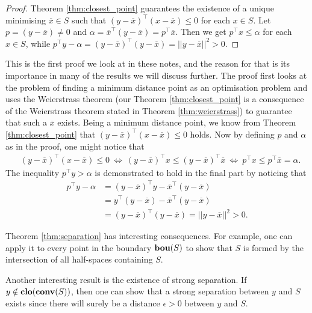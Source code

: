 %
\begin{proof}
	Theorem \ref{thm:closest_point} guarantees the existence of a unique minimising $\overline{x} \in S$ such that $(y-\overline{x})^\top(x - \overline{x}) \leq 0$ for each $x \in S$. Let $p = (y - \overline{x}) \neq 0$ and $\alpha = \overline{x}^\top(y - \overline{x}) = p^\top\overline{x}$. Then we get $p^\top x \leq \alpha$ for each $x \in S$, while $p^\top y - \alpha = (y - \overline{x})^\top(y - \overline{x}) = ||y - \overline{x}||^2 > 0$.
\end{proof}

This is the first proof we look at in these notes, and the reason for that is its importance in many of the results we will discuss further. The proof first looks at the problem of finding a minimum distance point as an optimisation problem and uses the Weierstrass theorem (our Theorem \ref{thm:closest_point} is a consequence of the Weierstrass theorem stated in Theorem \ref{thm:weierstrass}) to guarantee that such a $\overline{x}$ exists. Being a minimum distance point, we know from Theorem \ref{thm:closest_point} that $(y-\overline{x})^\top(x - \overline{x}) \leq 0$ holds. Now by defining $p$ and $\alpha$ as in the proof, one might notice that
%
\begin{align*}
	& (y-\overline{x})^\top(x - \overline{x}) \leq 0 \ \Leftrightarrow \ 
	(y-\overline{x})^\top x \leq (y - \overline{x})^\top\overline{x} \ \Leftrightarrow \ 
	p^\top x \leq p^\top\overline{x} = \alpha. 
\end{align*}
%
The inequality $p^\top y > \alpha$ is demonstrated to hold in the final part by noticing that 
%
\begin{align*}
	p^\top y - \alpha &= 
	(y - \overline{x})^\top y - \overline{x}^\top(y - \overline{x}) \\ &= 
	y^\top(y - \overline{x}) - \overline{x}^\top(y - \overline{x}) \\ & = (y - \overline{x})^\top (y - \overline{x}) = || y - \overline{x} ||^2 > 0.
\end{align*}

Theorem \ref{thm:separation} has interesting consequences. For example, one can apply it to every point in the boundary $\mathop{\bf bou}(S)$ to show that $S$ is formed by the intersection of all half-spaces containing $S$. 

Another interesting result is the existence of strong separation. If $y \notin \mathop{\bf clo}(\mathop{\bf conv}(S))$, then one can show that a strong separation between $y$ and $S$ exists since there will surely be a distance $\epsilon>0$ between $y$ and $S$. 


